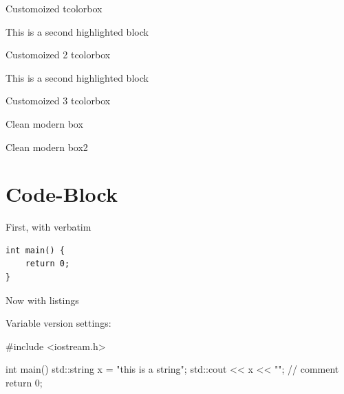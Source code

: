 \documentclass{article}
\begin{document}
Customoized tcolorbox

\begin{tcolorbox}[
    colback=blue!10,
    colframe=blue!5!green
]
This is a second highlighted block
\end{tcolorbox}

Customoized 2 tcolorbox

\begin{tcolorbox}[
    colback=blue!10,
    colframe=mycolor1
]
This is a second highlighted block
\end{tcolorbox}

Customoized 3 tcolorbox

\begin{tcolorbox}[
    colback=gray!10,
    colframe=gray!50,
    coltitle=blue,
    colbacktitle=orange!5,
    arc=6pt,
    boxrule=0.5pt,
    title=Hell Yeah Title,
]
Clean modern box
\end{tcolorbox}
 
\begin{tcolorbox}[
    colback=gray!10,
    colframe=gray!50,
    coltitle=blue,
    colbacktitle=orange!5,
    arc=6pt,
    boxrule=2.5pt,
    title=Hell Yeah Title,
    halign title = center
]
Clean modern box2
\end{tcolorbox}


\section{Code-Block}

First, with verbatim

\begin{verbatim}
int main() {
    return 0;
}
\end{verbatim}

Now with listings

%
%

Variable version settings:

\begin{codebox1}
#include <iostream.h>

int main() {
    std::string x = "this is a string";
    std::cout << x << "\n";
    // comment
    return 0;
}
\end{codebox1}
\end{document}
